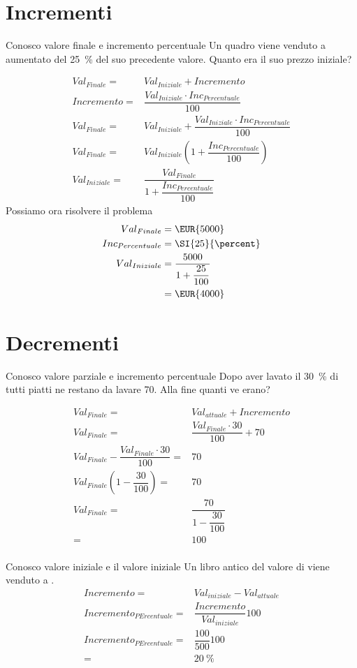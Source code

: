 \section{Incrementi}
	\begin{esempiot}{Conosco valore finale e incremento percentuale}{}
Un quadro viene venduto a   aumentato del \SI{25}{\percent} del suo precedente valore. Quanto era il suo prezzo iniziale?
\end{esempiot}
\begin{align*}
	{Val}_{Finale}={}&{Val}_{Iniziale}+Incremento\\
	Incremento={}&\dfrac{{Val}_{Iniziale}\cdot {Inc}_{Percentuale} }{100}\\
	{Val}_{Finale}={}&{Val}_{Iniziale}+\dfrac{{Val}_{Iniziale}\cdot {Inc}_{Percentuale} }{100}\\
	{Val}_{Finale}={}&{Val}_{Iniziale}\left(1+\dfrac{{Inc}_{Percentuale} }{100}\right)\\
	{Val}_{Iniziale}={}&\dfrac{{Val}_{Finale}}{1+\dfrac{{Inc}_{Percentuale} }{100}}
\end{align*}
Possiamo ora risolvere il problema
\begin{align*}
	{Val}_{Finale}={}&\mbox{\EUR{5000}}\\
	{Inc}_{Percentuale}={}&\SI{25}{\percent}\\
	{Val}_{Iniziale}={}&\dfrac{5000}{1+\dfrac{25}{100}}\\
	={}&\mbox{\EUR{4000}}\\
\end{align*}
\section{Decrementi}
	\begin{esempiot}{Conosco valore parziale e incremento percentuale}{}
Dopo aver lavato il \SI{30}{\percent} di tutti piatti ne restano da lavare \num{70}. Alla fine quanti ve erano?
\end{esempiot}
\begin{align*}
	{Val}_{Finale}={}&{Val}_{attuale}+Incremento\\
	{Val}_{Finale}={}&\dfrac{{Val}_{Finale}\cdot 30}{100}+70\\
	{Val}_{Finale}-\dfrac{{Val}_{Finale}\cdot 30}{100}={}&70\\
	{Val}_{Finale}\left(1-\dfrac{30}{100}\right)={}&70\\
	{Val}_{Finale}={}&\dfrac{70}{1-\dfrac{30}{100}}\\
	={}&100\\
\end{align*}
	\begin{esempiot}{Conosco valore iniziale  e il valore iniziale}{}
	Un libro antico del valore di  viene venduto a . 
	\begin{align*}
		Incremento={}&{Val}_{iniziale}-{Val}_{attuale}\\
		{Incremento}_{PErcentuale}={}&\dfrac{Incremento}{{Val}_{iniziale}}100\\
		{Incremento}_{PErcentuale}={}&\dfrac{100}{500}100\\
			={}&\SI{20}{\percent}\\
	\end{align*}
\end{esempiot}

